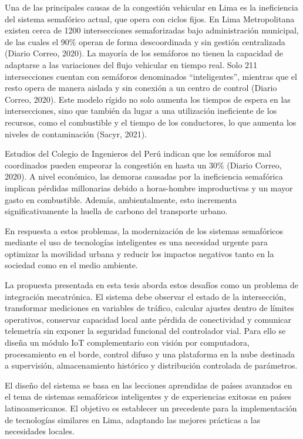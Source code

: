 \documentclass[12pt,a4paper,oneside]{report}
\begin{document}
Una de las principales causas de la congestión vehicular en Lima es la ineficiencia del sistema semafórico actual, que opera con ciclos fijos. En Lima Metropolitana existen cerca de 1200 intersecciones semaforizadas bajo administración municipal, de las cuales el 90\% operan de forma descoordinada y sin gestión centralizada (Diario Correo, 2020). La mayoría de los semáforos no tienen la capacidad de adaptarse a las variaciones del flujo vehicular en tiempo real. Solo 211 intersecciones cuentan con semáforos denominados ``inteligentes'', mientras que el resto opera de manera aislada y sin conexión a un centro de control (Diario Correo, 2020). Este modelo rígido no solo aumenta los tiempos de espera en las intersecciones, sino que también da lugar a una utilización ineficiente de los recursos, como el combustible y el tiempo de los conductores, lo que aumenta los niveles de contaminación (Sacyr, 2021).

Estudios del Colegio de Ingenieros del Perú indican que los semáforos mal coordinados pueden empeorar la congestión en hasta un 30\% (Diario Correo, 2020). A nivel económico, las demoras causadas por la ineficiencia semafórica implican pérdidas millonarias debido a horas-hombre improductivas y un mayor gasto en combustible. Además, ambientalmente, esto incrementa significativamente la huella de carbono del transporte urbano.

En respuesta a estos problemas, la modernización de los sistemas semafóricos mediante el uso de tecnologías inteligentes es una necesidad urgente para optimizar la movilidad urbana y reducir los impactos negativos tanto en la sociedad como en el medio ambiente.

La propuesta presentada en esta tesis aborda estos desafíos como un problema de integración mecatrónica. El sistema debe observar el estado de la intersección, transformar mediciones en variables de tráfico, calcular ajustes dentro de límites operativos, conservar capacidad local ante pérdida de conectividad y comunicar telemetría sin exponer la seguridad funcional del controlador vial. Para ello se diseña un módulo IoT complementario con visión por computadora, procesamiento en el borde, control difuso y una plataforma en la nube destinada a supervisión, almacenamiento histórico y distribución controlada de parámetros.

El diseño del sistema se basa en las lecciones aprendidas de países avanzados en el tema de sistemas semafóricos inteligentes y de experiencias exitosas en países latinoamericanos. El objetivo es establecer un precedente para la implementación de tecnologías similares en Lima, adaptando las mejores prácticas a las necesidades locales.
\end{document}
